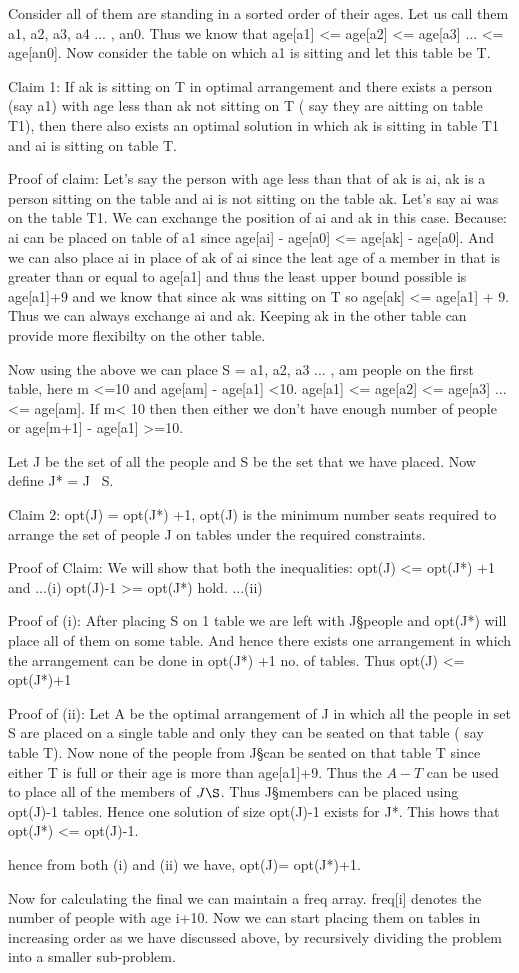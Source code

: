 \documentclass{article}
\begin{document}
Consider all of them are standing in a sorted order of their ages. Let us call them a1, a2, a3, a4 ... , an0.  Thus we know that age[a1] <= age[a2] <= age[a3] ... <= age[an0]. Now consider the table on which a1 is sitting and let this table be T.

Claim 1: If ak is sitting on T in optimal arrangement and there exists a person (say a1) with age less than ak not sitting on T ( say they are aitting on table T1), then there also exists an optimal solution in which ak is sitting in table T1 and ai is sitting on table T.

Proof of claim: Let's say the person with age less than that of ak is ai, ak is a person sitting on the table and ai is not sitting on the table ak. Let's say ai was on the table T1. We can exchange the position of ai and ak in this case. Because: ai can be placed on table of a1 since age[ai] - age[a0] <= age[ak] - age[a0]. And we can also place ai in place of ak of ai since the leat age of a member in that is greater than or equal to age[a1] and thus the least upper bound possible is age[a1]+9 and we know that since ak was sitting on T so age[ak] <= age[a1] + 9. Thus we can always exchange ai and ak. Keeping ak in the other table can provide more flexibilty on the other table.

Now using the above we can place S  = {a1, a2, a3 ... , am} people on the first table, here m <=10 and age[am] - age[a1] <10. age[a1] <= age[a2] <= age[a3] ... <= age[am]. If m< 10 then then either we don't have enough number of people or age[m+1] - age[a1] >=10. 

Let J be the set of all the people and S be the set that we have placed. Now define J* = J \ S.

Claim 2: opt(J) = opt(J*) +1, opt(J) is the minimum number seats required to arrange the set of people J on tables under the required constraints.

Proof of Claim:
We will show that both the inequalities: 
opt(J) <= opt(J*) +1 and        ...(i)
opt(J)-1 >= opt(J*) hold.       ...(ii)

Proof of (i):
After placing S on 1 table we are left with J\S people and opt(J*) will place all of them on some table. And hence there exists one arrangement in which the arrangement can be done in opt(J*) +1 no. of tables. Thus opt(J) <= opt(J*)+1

Proof of (ii):
Let A be the optimal arrangement of J in which all the people in set S are placed on a single table and only they can be seated on that table ( say table T). Now none of the people from J\S can be seated on that table T since either T is full or their age is more than age[a1]+9. Thus the $A-T$ can be used to place all of the members of $J\S$. Thus J\S members can be placed using opt(J)-1 tables. Hence one solution of size opt(J)-1 exists for J*. This hows that opt(J*) <= opt(J)-1.

hence from both (i) and (ii) we have, opt(J)= opt(J*)+1.

Now for calculating the final we can maintain a freq array. freq[i]  denotes the number of people with age i+10. Now we can start placing them on tables in increasing order as we have discussed above, by recursively dividing the problem into a smaller sub-problem. 
\end{document}
